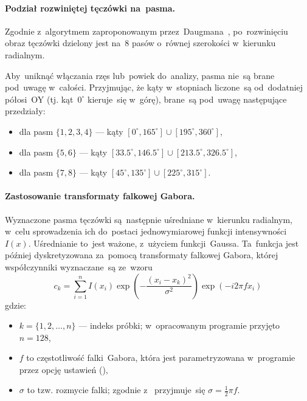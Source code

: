 \documentclass[11pt,a4paper]{article}
\begin{document}
\paragraph{Podział rozwiniętej tęczówki na~pasma.}
Zgodnie z~algorytmem zaproponowanym przez~Daugmana~\cite{slot2008}, po~rozwinięciu obraz tęczówki dzielony jest na~8 pasów o~równej szerokości w~kierunku radialnym.

Aby~uniknąć włączania rzęs lub~powiek do~analizy, pasma nie~są brane pod~uwagę w~całości.
Przyjmując, że kąty w~stopniach liczone~są od~dodatniej półosi~OY (tj. kąt~$0^\circ$ kieruje~się w~górę), brane~są pod~uwagę następujące przedziały:
\begin{itemize}
    \item dla pasm $\{ 1, 2, 3, 4 \}$ --- kąty $[0^\circ, 165^\circ] \cup [195^\circ, 360^\circ]$,
    \item dla pasm $\{ 5, 6 \}$ --- kąty $[33.5^\circ, 146.5^\circ] \cup [213.5^\circ, 326.5^\circ]$,
    \item dla pasm $\{ 7, 8 \}$ --- kąty $[45^\circ, 135^\circ] \cup [225^\circ, 315^\circ]$.
\end{itemize}

\paragraph{Zastosowanie transformaty falkowej Gabora.}
Wyznaczone pasma tęczówki są~następnie uśredniane w~kierunku radialnym, w~celu sprowadzenia ich do~postaci jednowymiarowej funkcji intensywności $I(x)$.
Uśrednianie to~jest ważone, z~użyciem funkcji~Gaussa.
Ta~funkcja jest później dyskretyzowana za~pomocą transformaty falkowej Gabora, której współczynniki wyznaczane~są ze~wzoru
$$ c_k = \sum_{i=1}^n I(x_i) \exp \left( -\frac{(x_i - x_k)^2}{\sigma^2} \right) \exp (-i 2 \pi f x_i) $$
gdzie:
\begin{itemize}
    \item $k = \{1, 2, \dots, n\}$ --- indeks próbki; w~opracowanym programie przyjęto $n = 128$,
    \item $f$ to częstotliwość falki~Gabora, która jest parametryzowana w~programie przez opcję ustawień (),
    \item $\sigma$ to tzw. rozmycie falki; zgodnie z~\cite{slot2008} przyjmuje~się $\sigma = \frac{1}{2} \pi f$.
\end{itemize}
\end{document}
